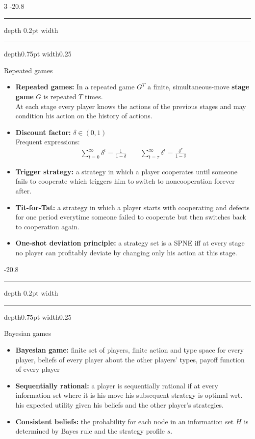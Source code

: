 \documentclass[a4paper,landscape,7pt,fleqn]{scrartcl}
\makeatletter
\renewcommand{\emph}[1]{\textbf{#1}}
\renewcommand{\subsection}{\@startsection{subsection}{1}{0mm}%
{-2\baselineskip}{0.8\baselineskip}%
{\hrule depth 0.2pt width\columnwidth\hrule depth0.75pt
width0.25\columnwidth\vspace*{1.2em}\large\bfseries}}
\makeatother
\begin{document}
\begin{multicols*}{3}
\subsection{Repeated games}
\begin{itemize}
\item \emph{Repeated games:} In a repeated game $G^T$ a finite, simultaneous-move \emph{stage game} $G$ is repeated $T$ times. \\
At each stage every player knows the actions of the previous stages and may condition his action on the history of actions.
\item \emph{Discount factor:} $\delta \in (0,1)$ \\
Frequent expressions:
\begin{align*}
\sum_{t=0}^\infty \delta^t = \frac{1}{1-\delta} \qquad \sum_{t=\tau}^\infty \delta^t = \frac{\delta^\tau}{1-\delta}
\end{align*}
\item \emph{Trigger strategy:} a strategy in which a player cooperates until someone fails to cooperate which triggers him to switch to noncooperation forever after.
\item \emph{Tit-for-Tat:} a strategy in which a player starts with cooperating and defects for one period everytime someone failed to cooperate but then switches back to cooperation again.
\item \emph{One-shot deviation principle:} a strategy set is a SPNE iff at every stage no player can profitably deviate by changing only his action at this stage.
\end{itemize}

\subsection{Bayesian games}
\begin{itemize}
\item \emph{Bayesian game:} finite set of players, finite action and type space for every player, beliefs of every player about the other players' types, payoff function of every player
\item \emph{Sequentially rational:} a player is sequentially rational if at every information set where it is his move his subsequent strategy is optimal wrt. his expected utility given his beliefs and the other player's strategies.
\item \emph{Consistent beliefs:} the probability for each node in an information set $H$ is determined by Bayes rule and the strategy profile $s$.
\end{itemize}


\end{multicols*}
\end{document}
